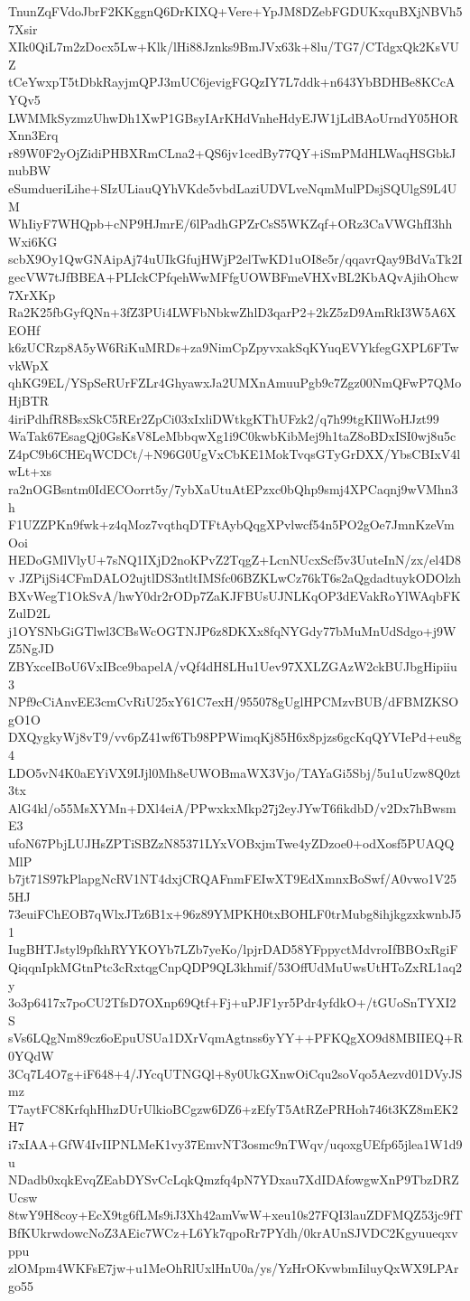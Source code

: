 TnunZqFVdoJbrF2KKggnQ6DrKIXQ+Vere+YpJM8DZebFGDUKxquBXjNBVh57Xsir
XIk0QiL7m2zDocx5Lw+Klk/lHi88Jznks9BmJVx63k+8lu/TG7/CTdgxQk2KsVUZ
tCeYwxpT5tDbkRayjmQPJ3mUC6jevigFGQzIY7L7ddk+n643YbBDHBe8KCcAYQv5
LWMMkSyzmzUhwDh1XwP1GBsyIArKHdVnheHdyEJW1jLdBAoUrndY05HORXnn3Erq
r89W0F2yOjZidiPHBXRmCLna2+QS6jv1cedBy77QY+iSmPMdHLWaqHSGbkJnubBW
eSumdueriLihe+SIzULiauQYhVKde5vbdLaziUDVLveNqmMulPDsjSQUlgS9L4UM
WhIiyF7WHQpb+cNP9HJmrE/6lPadhGPZrCsS5WKZqf+ORz3CaVWGhfI3hhWxi6KG
scbX9Oy1QwGNAipAj74uUIkGfujHWjP2elTwKD1uOI8e5r/qqavrQay9BdVaTk2I
gecVW7tJfBBEA+PLIckCPfqehWwMFfgUOWBFmeVHXvBL2KbAQvAjihOhcw7XrXKp
Ra2K25fbGyfQNn+3fZ3PUi4LWFbNbkwZhlD3qarP2+2kZ5zD9AmRkI3W5A6XEOHf
k6zUCRzp8A5yW6RiKuMRDs+za9NimCpZpyvxakSqKYuqEVYkfegGXPL6FTwvkWpX
qhKG9EL/YSpSeRUrFZLr4GhyawxJa2UMXnAmuuPgb9c7Zgz00NmQFwP7QMoHjBTR
4iriPdhfR8BsxSkC5REr2ZpCi03xIxliDWtkgKThUFzk2/q7h99tgKIlWoHJzt99
WaTak67EsagQj0GsKsV8LeMbbqwXg1i9C0kwbKibMej9h1taZ8oBDxISI0wj8u5c
Z4pC9b6CHEqWCDCt/+N96G0UgVxCbKE1MokTvqsGTyGrDXX/YbsCBIxV4lwLt+xs
ra2nOGBsntm0IdECOorrt5y/7ybXaUtuAtEPzxc0bQhp9smj4XPCaqnj9wVMhn3h
F1UZZPKn9fwk+z4qMoz7vqthqDTFtAybQqgXPvlwcf54n5PO2gOe7JmnKzeVmOoi
HEDoGMlVlyU+7sNQ1IXjD2noKPvZ2TqgZ+LcnNUcxScf5v3UuteInN/zx/el4D8v
JZPijSi4CFmDALO2ujtlDS3ntltIMSfc06BZKLwCz76kT6s2aQgdadtuykODOlzh
BXvWegT1OkSvA/hwY0dr2rODp7ZaKJFBUsUJNLKqOP3dEVakRoYlWAqbFKZulD2L
j1OYSNbGiGTlwl3CBsWcOGTNJP6z8DKXx8fqNYGdy77bMuMnUdSdgo+j9WZ5NgJD
ZBYxceIBoU6VxIBce9bapelA/vQf4dH8LHu1Uev97XXLZGAzW2ckBUJbgHipiiu3
NPf9cCiAnvEE3cmCvRiU25xY61C7exH/955078gUglHPCMzvBUB/dFBMZKSOgO1O
DXQygkyWj8vT9/vv6pZ41wf6Tb98PPWimqKj85H6x8pjzs6gcKqQYVIePd+eu8g4
LDO5vN4K0aEYiVX9IJjl0Mh8eUWOBmaWX3Vjo/TAYaGi5Sbj/5u1uUzw8Q0zt3tx
AlG4kl/o55MsXYMn+DXl4eiA/PPwxkxMkp27j2eyJYwT6fikdbD/v2Dx7hBwsmE3
ufoN67PbjLUJHsZPTiSBZzN85371LYxVOBxjmTwe4yZDzoe0+odXosf5PUAQQMlP
b7jt71S97kPlapgNcRV1NT4dxjCRQAFnmFEIwXT9EdXmnxBoSwf/A0vwo1V255HJ
73euiFChEOB7qWlxJTz6B1x+96z89YMPKH0txBOHLF0trMubg8ihjkgzxkwnbJ51
IugBHTJstyl9pfkhRYYKOYb7LZb7yeKo/lpjrDAD58YFppyctMdvroIfBBOxRgiF
QiqqnIpkMGtnPtc3cRxtqgCnpQDP9QL3khmif/53OffUdMuUwsUtHToZxRL1aq2y
3o3p6417x7poCU2TfsD7OXnp69Qtf+Fj+uPJF1yr5Pdr4yfdkO+/tGUoSnTYXI2S
sVs6LQgNm89cz6oEpuUSUa1DXrVqmAgtnss6yYY++PFKQgXO9d8MBIIEQ+R0YQdW
3Cq7L4O7g+iF648+4/JYcqUTNGQl+8y0UkGXnwOiCqu2soVqo5Aezvd01DVyJSmz
T7aytFC8KrfqhHhzDUrUlkioBCgzw6DZ6+zEfyT5AtRZePRHoh746t3KZ8mEK2H7
i7xIAA+GfW4IvIIPNLMeK1vy37EmvNT3osmc9nTWqv/uqoxgUEfp65jlea1W1d9u
NDadb0xqkEvqZEabDYSvCcLqkQmzfq4pN7YDxau7XdIDAfowgwXnP9TbzDRZUcsw
8twY9H8coy+EcX9tg6fLMs9iJ3Xh42amVwW+xeu10s27FQI3lauZDFMQZ53jc9fT
BfKUkrwdowcNoZ3AEic7WCz+L6Yk7qpoRr7PYdh/0krAUnSJVDC2Kgyuueqxvppu
zlOMpm4WKFsE7jw+u1MeOhRlUxlHnU0a/ys/YzHrOKvwbmIiluyQxWX9LPArgo55
